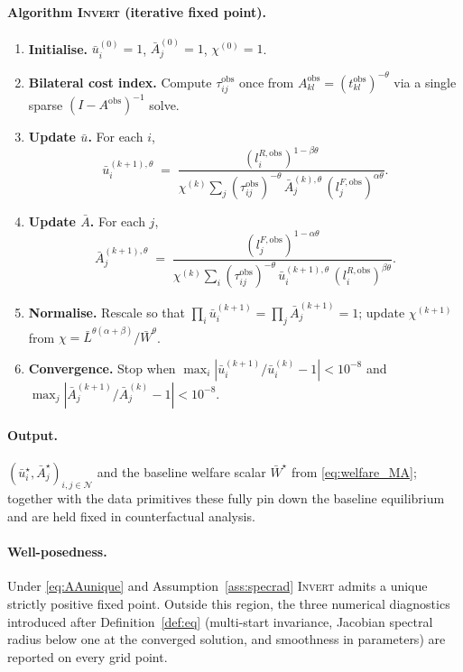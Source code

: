 \documentclass[12pt]{article}
\newcommand{\N}{\mathcal N}
\newcommand{\Lbar}{\bar L}
\newcommand{\Wbar}{\bar W}
\newcommand{\ubar}{\bar u}
\newcommand{\Abar}{\bar A}
\newcommand{\tkl}{t_{kl}}
\newcommand{\tijk}{\tau_{ij}}
\newcommand{\obs}{\mathrm{obs}}
\begin{document}
\paragraph{Algorithm \textsc{Invert} (iterative fixed point).}

\begin{enumerate}[leftmargin=2em,itemsep=0.2em]
\item \textbf{Initialise.} $\ubar_i^{(0)}=1$, $\Abar_j^{(0)}=1$,
  $\chi^{(0)}=1$.
\item \textbf{Bilateral cost index.} Compute $\tijk^{\obs}$ once
  from $A^{\obs}_{kl}=(\tkl^{\obs})^{-\theta}$ via a single sparse
  $(I-A^{\obs})^{-1}$ solve.
\item \textbf{Update $\ubar$.} For each $i$,
\begin{equation}
  \ubar_i^{(k+1),\theta}
  \;=\;
  \frac{(l_i^{R,\obs})^{1-\beta\theta}}
       {\chi^{(k)}\sum_{j}(\tijk^{\obs})^{-\theta}\,
                    \Abar_j^{(k),\theta}\,(l_j^{F,\obs})^{\alpha\theta}}.
\end{equation}
\item \textbf{Update $\Abar$.} For each $j$,
\begin{equation}
  \Abar_j^{(k+1),\theta}
  \;=\;
  \frac{(l_j^{F,\obs})^{1-\alpha\theta}}
       {\chi^{(k)}\sum_{i}(\tijk^{\obs})^{-\theta}\,
                    \ubar_i^{(k+1),\theta}\,(l_i^{R,\obs})^{\beta\theta}}.
\end{equation}
\item \textbf{Normalise.} Rescale so that
  $\prod_i\ubar_i^{(k+1)}=\prod_j\Abar_j^{(k+1)}=1$;
  update $\chi^{(k+1)}$ from $\chi=\Lbar^{\theta(\alpha+\beta)}/
  \Wbar^{\theta}$.
\item \textbf{Convergence.} Stop when
  $\max_i|\ubar_i^{(k+1)}/\ubar_i^{(k)}-1|<10^{-8}$ and
  $\max_j|\Abar_j^{(k+1)}/\Abar_j^{(k)}-1|<10^{-8}$.
\end{enumerate}

\paragraph{Output.}
$(\ubar_i^{\star},\Abar_j^{\star})_{i,j\in\N}$ and the baseline
welfare scalar $\Wbar^{\star}$ from \eqref{eq:welfare_MA}; together
with the data primitives these fully pin down the baseline
equilibrium and are held fixed in counterfactual analysis.

\paragraph{Well-posedness.}
Under \eqref{eq:AAunique} and Assumption~\ref{ass:specrad}
\textsc{Invert} admits a unique strictly positive fixed point.
Outside this region, the three numerical diagnostics introduced
after Definition~\ref{def:eq} (multi-start invariance, Jacobian
spectral radius below one at the converged solution, and smoothness
in parameters) are reported on every grid point.
\end{document}

